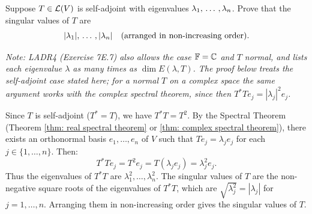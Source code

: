 \begin{xrcs}
  Suppose $T \in \mathcal{L}(V)$ is self-adjoint with eigenvalues $\lambda_1, {\, \ldots \,\,}, \lambda_n$. Prove that the singular values of $T$ are
  \begin{equation}
    |\lambda_1|, {\, \ldots \,\,}, |\lambda_n| \quad \text{(arranged in non-increasing order)}.
  \end{equation}

  \emph{Note: LADR4 (Exercise 7E.7) also allows the case $\mathbb{F} = \mathbb{C}$ and $T$ normal, and lists each eigenvalue $\lambda$ as many times as $\dim E(\lambda, T)$. The proof below treats the self-adjoint case stated here; for a normal $T$ on a complex space the same argument works with the complex spectral theorem, since then $T^*T e_j = |\lambda_j|^2 e_j$.}

\begin{xprf}
  Since $T$ is self-adjoint ($T^* = T$), we have $T^*T = T^2$.
  By the Spectral Theorem (Theorem \ref{thm: real spectral theorem} or \ref{thm: complex spectral theorem}), there exists an orthonormal basis $e_1, \dots, e_n$ of $V$ such that $T e_j = \lambda_j e_j$ for each $j \in \{1, \dots, n\}$.
  Then:
  \[
    T^* T e_j = T^2 e_j = T(\lambda_j e_j) = \lambda_j^2 e_j.
  \]
  Thus the eigenvalues of $T^*T$ are $\lambda_1^2, \dots, \lambda_n^2$.
  The singular values of $T$ are the non-negative square roots of the eigenvalues of $T^*T$, which are $\sqrt{\lambda_j^2} = |\lambda_j|$ for $j = 1, \dots, n$.
  Arranging them in non-increasing order gives the singular values of $T$.
\end{xprf}
\end{xrcs}

